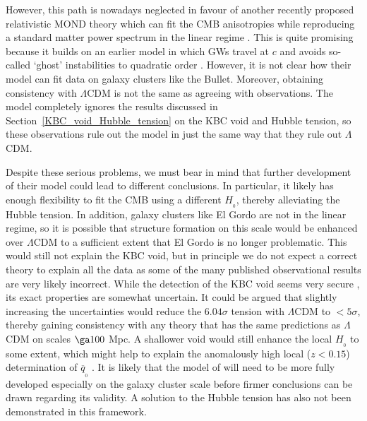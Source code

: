 \documentclass[fleqn,usenatbib,useAMS]{mnras} %
\begin{document}
However, this path is nowadays neglected in favour of another recently proposed relativistic MOND theory which can fit the CMB anisotropies while reproducing a standard matter power spectrum in the linear regime \citep{Skordis_2021}. This is quite promising because it builds on an earlier model in which GWs travel at $c$ \citep{Skordis_2019} and avoids so-called `ghost' instabilities to quadratic order \citep{Skordis_2021, Skordis_2021_stability}. However, it is not clear how their model can fit data on galaxy clusters like the Bullet. Moreover, obtaining consistency with $\Lambda$CDM is not the same as agreeing with observations. The model completely ignores the results discussed in Section~\ref{KBC_void_Hubble_tension} on the KBC void and Hubble tension, so these observations rule out the \citet{Skordis_2021} model in just the same way that they rule out $\Lambda$CDM.

Despite these serious problems, we must bear in mind that further development of their model could lead to different conclusions. In particular, it likely has enough flexibility to fit the CMB using a different $H_{_0}$, thereby alleviating the Hubble tension. In addition, galaxy clusters like El Gordo are not in the linear regime, so it is possible that structure formation on this scale would be enhanced over $\Lambda$CDM to a sufficient extent that El Gordo is no longer problematic. This would still not explain the KBC void, but in principle we do not expect a correct theory to explain all the data as some of the many published observational results are very likely incorrect. While the detection of the KBC void seems very secure \citep{Wong_2022}, its exact properties are somewhat uncertain. It could be argued that slightly increasing the uncertainties would reduce the $6.04\sigma$ tension with $\Lambda$CDM \citep{Haslbauer_2020} to $<5 \sigma$, thereby gaining consistency with any theory that has the same predictions as $\Lambda$CDM on scales $\ga 100$ Mpc. A shallower void would still enhance the local $H_{_0}$ to some extent, which might help to explain the anomalously high local ($z < 0.15$) determination of $\overline{q}_{_0}$ \citep[e.g.][]{Camarena_2020a, Camarena_2020b}. It is likely that the model of \citet{Skordis_2021} will need to be more fully developed especially on the galaxy cluster scale before firmer conclusions can be drawn regarding its validity. A solution to the Hubble tension has also not been demonstrated in this framework.
\end{document}
